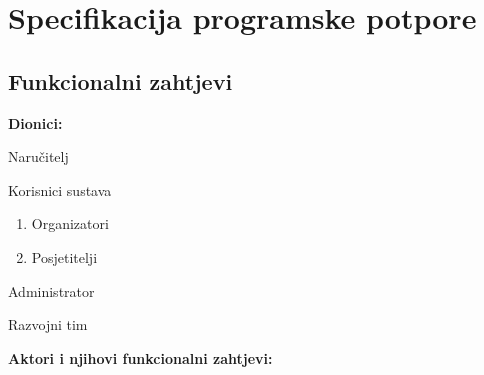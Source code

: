 \chapter{Specifikacija programske potpore}
		
	\section{Funkcionalni zahtjevi}
			
			\noindent \textbf{Dionici:}
		
		\begin{packed_enum}

		

			\item Naručitelj
			\item Korisnici sustava
					\begin{enumerate}
						\item Organizatori
						\item Posjetitelji
					\end{enumerate}
			\item Administrator			
			\item Razvojni tim
			
		\end{packed_enum}
		
		\noindent \textbf{Aktori i njihovi funkcionalni zahtjevi:}
		
